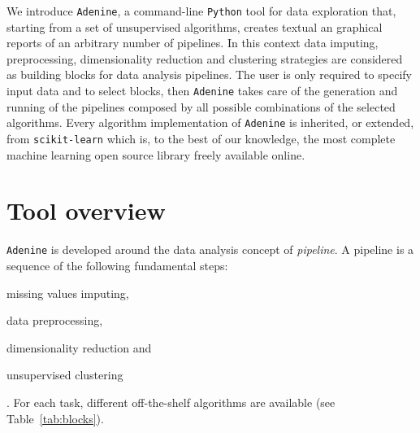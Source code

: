 \documentclass[twoside,11pt]{article}
\makeatletter
\newcommand{\ade}{\texttt{Adenine}\@\xspace}
\newcommand{\py}{\texttt{Python}\@\xspace}
\makeatother
\begin{document}
We introduce \ade, a command-line \py tool for data exploration that, starting from a set of unsupervised algorithms, creates textual an graphical reports of an arbitrary number of pipelines. In this context data imputing, preprocessing, dimensionality reduction and clustering strategies are considered as building blocks for data analysis pipelines. The user is only required to specify input data and to select blocks, then \ade takes care of the generation and running of the pipelines composed by all possible combinations of the selected algorithms. Every algorithm implementation of \ade is inherited, or extended, from \texttt{scikit-learn} \citep{scikit-learn} which is, to the best of our knowledge, the most complete machine learning open source library freely available online.


\section{Tool overview}\label{sec:implem}
\ade is developed around the data analysis concept of \emph{pipeline}. A pipeline is a sequence of the following fundamental steps:
\begin{enumerate*}[label=(\roman*)]
  \item missing values imputing,
  \item data preprocessing,
  \item dimensionality reduction and
  \item unsupervised clustering
\end{enumerate*}. 
For each task, different off-the-shelf algorithms are available (see Table~\ref{tab:blocks}).%



\end{document}
